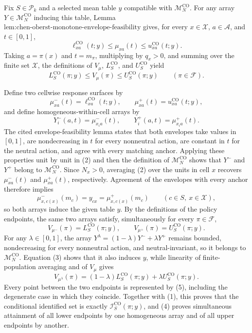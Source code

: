 Fix \(S\in\mathcal P_k\) and a selected mean table \(y\) compatible with \(\mathcal M_N^{\mathrm{CO}}\).  For any array \(Y\in\mathcal M_N^{\mathrm{CO}}\) inducing this table, Lemma \(\text{lem:chen-oberst-monotone-envelope-feasibility}\) gives, for every \(x\in\mathcal X\), \(a\in\mathcal A\), and \(t\in[0,1]\),
\[
\ell^{\mathrm{CO}}_{xa}(t;y)
\leq \mu_{xa}(t)
\leq u^{\mathrm{CO}}_{xa}(t;y).
\]
Taking \(a=\pi(x)\) and \(t=m_\pi\), multiplying by \(q_x>0\), and summing over the finite set \(\mathcal X\), the definitions of \(V_\mu\), \(L^{\mathrm{CO}}_S\), and \(U^{\mathrm{CO}}_S\) yield
\[
L^{\mathrm{CO}}_S(\pi;y)
\leq V_\mu(\pi)
\leq U^{\mathrm{CO}}_S(\pi;y)
\qquad(\pi\in\mathcal F).
\tag{1}
\]

Define two cellwise response surfaces by
\[
\mu^-_{xa}(t)=\ell^{\mathrm{CO}}_{xa}(t;y),
\qquad
\mu^+_{xa}(t)=u^{\mathrm{CO}}_{xa}(t;y),
\]
and define homogeneous-within-cell arrays by
\[
Y_i^-(a,t)=\mu^-_{x_i a}(t),
\qquad
Y_i^+(a,t)=\mu^+_{x_i a}(t).
\tag{2}
\]
The cited envelope-feasibility lemma states that both envelopes take values in \([0,1]\), are nondecreasing in \(t\) for every nonneutral action, are constant in \(t\) for the neutral action, and agree with every matching anchor.  Applying these properties unit by unit in (2) and then the definition of \(\mathcal M_N^{\mathrm{CO}}\) shows that \(Y^-\) and \(Y^+\) belong to \(\mathcal M_N^{\mathrm{CO}}\).  Since \(N_x>0\), averaging (2) over the units in cell \(x\) recovers \(\mu^-_{xa}(t)\) and \(\mu^+_{xa}(t)\), respectively.  Agreement of the envelopes with every anchor therefore implies
\[
\mu^-_{x,c(x)}(m_c)=y_{cx}
=\mu^+_{x,c(x)}(m_c)
\qquad(c\in S,\ x\in\mathcal X),
\tag{3}
\]
so both arrays induce the given table \(y\).  By the definitions of the policy endpoints, the same two arrays satisfy, simultaneously for every \(\pi\in\mathcal F\),
\[
V_{\mu^-}(\pi)=L^{\mathrm{CO}}_S(\pi;y),
\qquad
V_{\mu^+}(\pi)=U^{\mathrm{CO}}_S(\pi;y).
\tag{4}
\]
For any \(\lambda\in[0,1]\), the array \(Y^\lambda=(1-\lambda)Y^-+\lambda Y^+\) remains bounded, nondecreasing for every nonneutral action, and neutral-invariant, so it belongs to \(\mathcal M_N^{\mathrm{CO}}\).  Equation (3) shows that it also induces \(y\), while linearity of finite-population averaging and of \(V_\mu\) gives
\[
V_{\mu^\lambda}(\pi)
=(1-\lambda)L^{\mathrm{CO}}_S(\pi;y)
+\lambda U^{\mathrm{CO}}_S(\pi;y).
\tag{5}
\]
Every point between the two endpoints is represented by (5), including the degenerate case in which they coincide.  Together with (1), this proves that the conditional identified set is exactly \(\mathcal I^{\mathrm{CO}}_S(\pi;y)\), and (4) proves simultaneous attainment of all lower endpoints by one homogeneous array and of all upper endpoints by another.

